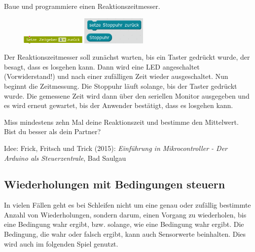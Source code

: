 \bigskip
\begin{projekt}[Reaktionszeitmesser]\label{proj:reaktionszeitmesser}
	Baue und programmiere einen Reaktionszeitmesser.
	
	\begin{figure}
		\centering
		\includegraphics[width=0.28\textwidth]{./pics/stoppuhr2.png}
		\includegraphics[width=0.28\textwidth]{./pics/stoppuhr.png}
	\end{figure}
	Der Reaktionszeitmesser soll zunächst warten, bis ein Taster gedrückt wurde, der besagt, dass es losgehen kann. Dann wird eine LED angeschaltet (Vorwiderstand!) und nach einer zufälligen Zeit wieder ausgeschaltet. Nun beginnt die Zeitmessung. Die Stoppuhr läuft solange, bis der Taster gedrückt wurde. Die gemessene Zeit wird dann über den seriellen Monitor ausgegeben und es wird erneut gewartet, bis der Anwender bestätigt, dass es losgehen kann.
	
	Miss mindestens zehn Mal deine Reaktionszeit und bestimme den Mittelwert. Bist du besser als dein Partner?
	
	{\scriptsize Idee: Frick, Fritsch und Trick (2015): \emph{Einführung in Mikrocontroller - Der Arduino als Steuerzentrale}, Bad Saulgau}
\end{projekt}

\subsection{Wiederholungen mit Bedingungen steuern}
\label{sec:while-schleife}

In vielen Fällen geht es bei Schleifen nicht um eine genau oder zufällig bestimmte Anzahl von Wiederholungen, sondern darum, einen Vorgang zu wiederholen, bis eine Bedingung wahr ergibt, bzw. solange, wie eine Bedingung wahr ergibt. Die Bedingung, die wahr oder falsch ergibt, kann auch Sensorwerte beinhalten. Dies wird auch im folgenden Spiel genutzt.

